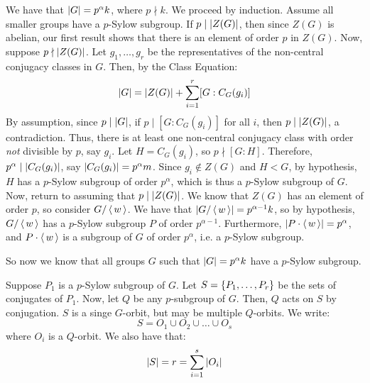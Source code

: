 \begin{pf}[source=Primary Source Material]
    We have that $ \abs{G} = p^{\alpha}k $, where $ p \nmid k $. \vsp
    We proceed by induction.
    Assume all smaller groups have a $ p $-Sylow subgroup.
    If $ p \mid \abs{Z(G)} $, then since $ Z(G) $ is abelian, our first result
    shows that there is an element of order $ p $ in $ Z(G) $. \vsp
    Now, suppose $ p \nmid \abs{Z(G)} $. Let $ g_{1}, \dots, g_{r} $ be the representatives of the
    non-central conjugacy classes in $ G $. Then, by the Class Equation:
    \begin{equation*}
        \abs{G} = \abs{Z(G)} + \sum_{i=1}^{r}[G:C_{G}(g_{i})]
    \end{equation*}
    By assumption, since $ p \mid \abs{G} $, if $ p \mid [G:C_{G}(g_{i})] $ for all $ i $,
    then $ p \mid \abs{Z(G)} $, a contradiction. Thus, there is at least one non-central
    conjugacy class with order \textit{not} divisible by $ p $, say $ g_{i} $. \vsp
    Let $ H = C_{G}(g_{i}) $, so $ p \nmid [G:H] $.
    Therefore, $ p^{\alpha} \mid \abs{C_{G}(g_{i})} $, say $ \abs{C_{G}(g_{i})} = p^{\alpha}m $.
    Since $ g_{i} \notin Z(G) $ and $ H < G $, by hypothesis, $ H $ has a $ p $-Sylow subgroup
    of order $ p^{\alpha} $, which is thus a $ p $-Sylow subgroup of $ G $. \vsp
    Now, return to assuming that $ p \mid \abs{Z(G)} $.
    We know that $ Z(G) $ has an element of order $ p $, so consider $ G/\operatorname{\langle} w \operatorname{\rangle} $.
    We have that $ \abs{G/\operatorname{\langle} w \operatorname{\rangle}} = p^{\alpha-1}k $, so by hypothesis, $ G/\operatorname{\langle} w \operatorname{\rangle} $ has
    a $ p $-Sylow subgroup $ P $ of order $ p^{\alpha-1} $.
    Furthermore, $ \abs{P \cdot \operatorname{\langle} w \operatorname{\rangle}} = p^{\alpha} $, and $ P \cdot \operatorname{\langle} w \operatorname{\rangle} $ is a
    subgroup of $ G $ of order $ p^{\alpha} $, i.e. a $ p $-Sylow subgroup.
\end{pf}
So now we know that all groups $ G $ such that $ \abs{G} = p^{\alpha}k $ have a $ p $-Sylow
subgroup. \npgh

Suppose $ P_{1} $ is a $ p $-Sylow subgroup of $ G $. Let $ S = \left\{{P_{1}, \dots, P_{r}}\right\} $ be
the sets of conjugates of $ P_{1} $. Now, let $ Q $ be any $ p $-subgroup of $ G $.
Then, $ Q $ acts on $ S $ by conjugation. $ S $ is a singe $ G $-orbit, but may be multiple
$ Q $-orbits. We write:
\begin{equation*}
    S = O_{1} \cup O_{2} \cup \dots \cup O_{s}
\end{equation*}
where $ O_{i} $ is a $ Q $-orbit. We also have that:
\begin{equation*}
    \abs{S} = r = \sum_{i=1}^{s} \abs{O_{i}}
\end{equation*}

